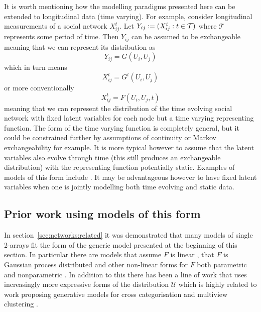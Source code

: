 It is worth mentioning how the modelling paradigms presented here can be extended to longitudinal data (\ie time varying).
For example, consider longitudinal measurements of a social network $X_{ij}^t$.
Let $Y_{ij} := (X_{ij}^t : t \in \mathcal{T})$ where $\mathcal{T}$ represents some period of time.
Then $Y_{ij}$ can be assumed to be exchangeable meaning that we can represent its distribution as
\[
  Y_{ij} = G(U_i, U_j)
\]
which in turn means
\[
  X_{ij}^t = G^t(U_i, U_j)
\]
or more conventionally
\[
  X_{ij}^t = F(U_i, U_j, t)
\]
meaning that we can represent the distribution of the time evolving social network with fixed latent variables for each node but a time varying representing function.
The form of the time varying function is completely general, but it could be constrained further by assumptions of continuity or Markov exchangeability for example.
It is more typical however to assume that the latent variables also evolve through time (this still produces an exchangeable distribution) with the representing function potentially static.
Examples of models of this form include \cite[e.g.][]{Adams2010-ln, durante2014bayesian}.
It may be advantageous however to have fixed latent variables when one is jointly modelling both time evolving and static data.

\subsection{Prior work using models of this form}
\label{sec:arrays:related}

In section~\ref{sec:networks:related} it was demonstrated that many models of single 2-arrays fit the form of the generic model presented at the beginning of this section.
In particular there are models that assume $F$ is linear \citep[e.g.][]{Hoff2007-ja, Meeds2007-gd, Salakhutdinov2008-zt, Yu2008-tz, Miller2009-wg}, that $F$ is Gaussian process distributed \citep[e.g.][]{Lawrence2009-za, Yan2011-lc, Lloyd2012-sb} and other non-linear forms for $F$ both parametric \citep[e.g.][]{Hoff2002-vy} and nonparametric \citep[e.g.][]{Roy2009-ge}.
In addition to this there has been a line of work that uses increasingly more expressive forms of the distribution $\mathcal{U}$ \citep[e.g.][]{Wang1987-jd, Hoffman_undated-ri, Nowicki2001-xm, Kemp2006-jt, Xu2006-uy, Meeds2007-gd, Miller2009-wg, Palla2012-ch} which is highly related to work proposing generative models for cross categorisation and multiview clustering \citep[e.g.][]{Niu2012-kl, Li2011-bk, Shafto2011-pu, Mansinghka2009-lx}.

